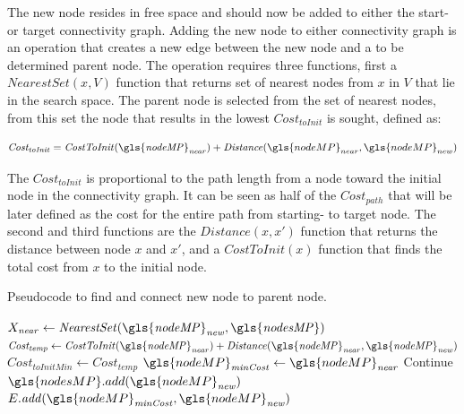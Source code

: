 The new node resides in free space and should now be added to either the start- or target connectivity graph. Adding the new node to either connectivity graph is an operation that creates a new edge between the new node and a to be determined parent node. The operation requires three functions, first a $\mathit{NearestSet}(x, V)$ function that returns set of nearest nodes from $x$ in $V$ that lie in the search space. The parent node is selected from the set of nearest nodes, from this set the node that results in the lowest $\mathit{Cost_{toInit}}$ is sought, defined as:\bs

\[\mathit{Cost_{toInit}} = \mathit{CostToInit(\gls{nodeMP}_{near})} + \mathit{Distance}(\gls{nodeMP}_{near}, \gls{nodeMP}_{new})\]

The $\mathit{Cost_{toInit}}$ is proportional to the path length from a node toward the initial node in the connectivity graph. It can be seen as half of the $\mathit{Cost_{path}}$ that will be later defined as the cost for the entire path from starting- to target node. The second and third functions are the $\mathit{Distance}(x, x')$ function that returns the distance between node $x$ and $x'$, and a $\mathit{CostToInit}(x)$ function that finds the total cost from $x$ to the initial node.\bs

\begin{algorithm}[H]
\caption{Pseudocode to find and connect new node to parent node.}%
\label{pseudocode:proposed_rrt_star_two}
\begin{algorithmic}[1]
\hspace{-0.9cm}\colorbox{my_yellow}{\parbox{\linewidth}{%
    \State $X_\mathit{near} \leftarrow \mathit{NearestSet(\gls{nodeMP}_{new}, \gls{nodesMP})}$
    \State $\mathit{Cost_{temp}} \leftarrow \mathit{CostToInit(\gls{nodeMP}_{near}) + Distance(\gls{nodeMP}_{near}, \gls{nodeMP}_{new})}$
    \State $\mathit{Cost_{toInitMin}} \leftarrow \mathit{Cost_{temp}}$
    \State $\gls{nodeMP}_\mathit{minCost} \leftarrow \gls{nodeMP}_\mathit{near}$
        \EndIf
    \EndFor
        \State Continue
    \Else
    \State $\gls{nodesMP}.add(\gls{nodeMP}_\mathit{new})$
    \State $E.\mathit{add}(\gls{nodeMP}_\mathit{minCost}, \gls{nodeMP}_\mathit{new})$
    \EndIf
}}
\end{algorithmic}
\end{algorithm}

